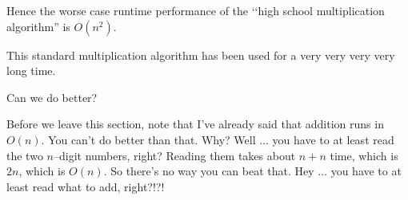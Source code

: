 Hence the worse case runtime performance of the 
\lq\lq high school multiplication algorithm'' is $O(n^2)$.

This standard multiplication
algorithm has been used for a very very very very long time.

Can we do better?

Before we leave this section, note that
I've already said that addition runs in $O(n)$.
You can't do better than that.
Why?
Well ... you have to at least read the two $n$--digit numbers, right?
Reading them takes about $n + n$ time, which is $2n$, which is $O(n)$.
So there's no way you can beat that.
Hey ... you have to at least read what to add, right?!?!

\newpage



